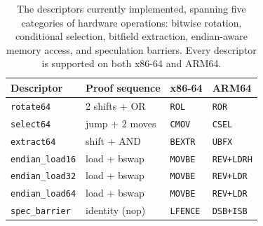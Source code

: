 \begin{table}[t]
\centering
\small
\caption{The \lang descriptors currently implemented, spanning five categories of hardware operations: bitwise rotation, conditional selection, bitfield extraction, endian-aware memory access, and speculation barriers. Every descriptor is supported on both x86-64 and ARM64.}
\label{tab:descriptors}
\begin{tabular*}{\columnwidth}{@{\extracolsep{\fill}}llll@{}}
\toprule
Descriptor & Proof sequence & x86-64 & ARM64 \\
\midrule
\texttt{rotate64} & 2 shifts + OR & \texttt{ROL} & \texttt{ROR} \\
\texttt{select64} & jump + 2 moves & \texttt{CMOV} & \texttt{CSEL} \\
\texttt{extract64} & shift + AND & \texttt{BEXTR} & \texttt{UBFX} \\
\texttt{endian\_load16} & load + bswap & \texttt{MOVBE} & \texttt{REV+LDRH} \\
\texttt{endian\_load32} & load + bswap & \texttt{MOVBE} & \texttt{REV+LDR} \\
\texttt{endian\_load64} & load + bswap & \texttt{MOVBE} & \texttt{REV+LDR} \\
\texttt{spec\_barrier} & identity (nop) & \texttt{LFENCE} & \texttt{DSB+ISB} \\
\bottomrule
\end{tabular*}
\end{table}
